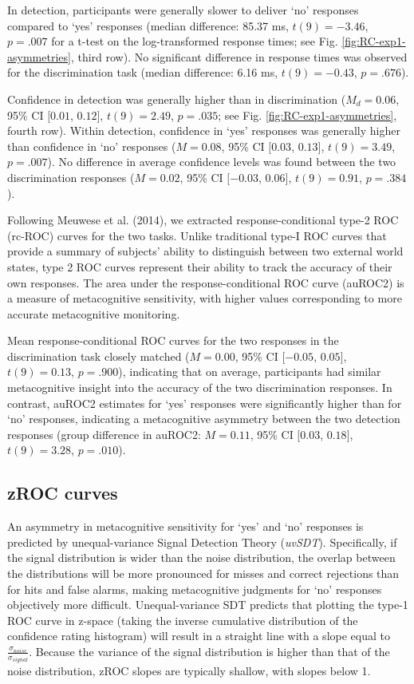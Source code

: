 \documentclass[12pt,twoside]{reedthesis}
\begin{document}
In detection, participants were generally slower to deliver `no' responses compared to `yes' responses (median difference: 85.37 ms, \(t(9) = -3.46\), \(p = .007\) for a t-test on the log-transformed response times; see Fig. \ref{fig:RC-exp1-asymmetries}, third row). No significant difference in response times was observed for the discrimination task (median difference: 6.16 ms, \(t(9) = -0.43\), \(p = .676\)).

Confidence in detection was generally higher than in discrimination (\(M_d = 0.06\), 95\% CI \([0.01\), \(0.12]\), \(t(9) = 2.49\), \(p = .035\); see Fig. \ref{fig:RC-exp1-asymmetries}, fourth row). Within detection, confidence in `yes' responses was generally higher than confidence in `no' responses (\(M = 0.08\), 95\% CI \([0.03\), \(0.13]\), \(t(9) = 3.49\), \(p = .007\)). No difference in average confidence levels was found between the two discrimination responses (\(M = 0.02\), 95\% CI \([-0.03\), \(0.06]\), \(t(9) = 0.91\), \(p = .384\)).

Following Meuwese et al. (2014), we extracted response-conditional type-2 ROC (rc-ROC) curves for the two tasks. Unlike traditional type-I ROC curves that provide a summary of subjects' ability to distinguish between two external world states, type 2 ROC curves represent their ability to track the accuracy of their own responses. The area under the response-conditional ROC curve (auROC2) is a measure of metacognitive sensitivity, with higher values corresponding to more accurate metacognitive monitoring.

Mean response-conditional ROC curves for the two responses in the discrimination task closely matched (\(M = 0.00\), 95\% CI \([-0.05\), \(0.05]\), \(t(9) = 0.13\), \(p = .900\)), indicating that on average, participants had similar metacognitive insight into the accuracy of the two discrimination responses. In contrast, auROC2 estimates for `yes' responses were significantly higher than for `no' responses, indicating a metacognitive asymmetry between the two detection responses (group difference in auROC2: \(M = 0.11\), 95\% CI \([0.03\), \(0.18]\), \(t(9) = 3.28\), \(p = .010\)).

\hypertarget{zroc-curves}{%
\subsection{zROC curves}\label{zroc-curves}}

An asymmetry in metacognitive sensitivity for `yes' and `no' responses is predicted by unequal-variance Signal Detection Theory (\emph{uvSDT}). Specifically, if the signal distribution is wider than the noise distribution, the overlap between the distributions will be more pronounced for misses and correct rejections than for hits and false alarms, making metacognitive judgments for `no' responses objectively more difficult. Unequal-variance SDT predicts that plotting the type-1 ROC curve in z-space (taking the inverse cumulative distribution of the confidence rating histogram) will result in a straight line with a slope equal to \(\frac{\sigma_{noise}}{\sigma_{signal}}\). Because the variance of the signal distribution is higher than that of the noise distribution, zROC slopes are typically shallow, with slopes below 1.
\end{document}

